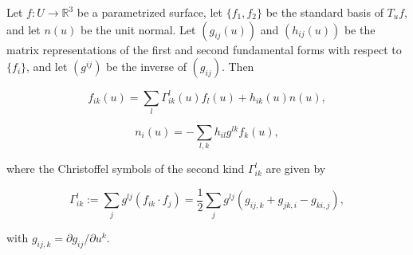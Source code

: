 Let $f: U \to \mathbb{R}^3$ be a parametrized surface, let $\{f_1, f_2\}$ be the standard basis of $T_u f$, and let $n(u)$ be the unit normal. Let $(g_{ij}(u))$ and $(h_{ij}(u))$ be the matrix representations of the first and second fundamental forms with respect to $\{f_i\}$, and let $(g^{ij})$ be the inverse of $(g_{ij})$. Then

$$
f_{ik}(u) = \sum_{l} \Gamma_{ik}^l(u) f_l(u) + h_{ik}(u) n(u),
$$

$$
n_i(u) = -\sum_{l,k} h_{il} g^{lk} f_k(u),
$$

where the Christoffel symbols of the second kind $\Gamma_{ik}^l$ are given by

$$
\Gamma_{ik}^l := \sum_j g^{lj} (f_{ik} \cdot f_j) = \frac{1}{2} \sum_j g^{lj} (g_{ij,k} + g_{jk,i} - g_{ki,j}),
$$

with $g_{ij,k} = \partial g_{ij} / \partial u^k$.
